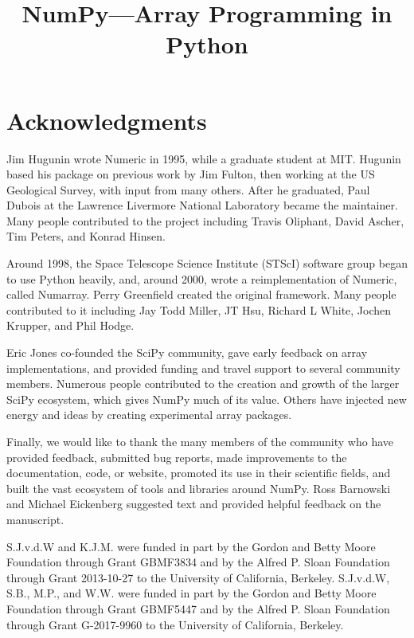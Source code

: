 \documentclass[fleqn,10pt,twocolumn]{wlscirep}
\title{NumPy---Array Programming in Python}
\begin{document}
\flushbottom
\maketitle
\thispagestyle{empty}







\newpage



\section*{Acknowledgments}

Jim Hugunin wrote Numeric in 1995, while a graduate student at MIT.
Hugunin based his package on previous work by Jim Fulton, then working at the
US Geological Survey, with input from many others.
After he graduated, Paul Dubois at the Lawrence Livermore National Laboratory
became the maintainer.
Many people contributed to the project including Travis Oliphant, David Ascher,
Tim Peters, and Konrad Hinsen.

Around 1998, the Space Telescope Science Institute (STScI) software group began
to use Python heavily, and, around 2000, wrote a reimplementation of
Numeric, called Numarray.
Perry Greenfield created the original framework.
Many people contributed to it including Jay Todd Miller, JT Hsu, Richard
L White, Jochen Krupper, and Phil Hodge.

Eric Jones co-founded the SciPy community, gave early feedback on array
implementations, and provided funding and travel support to several community
members.
Numerous people contributed to the creation and growth of the larger SciPy
ecosystem, which gives NumPy much of its value.  Others have injected new
energy and ideas by creating experimental array packages.

Finally, we would like to thank the many members of the community who have provided
feedback, submitted bug reports, made improvements to the documentation,
code, or website, promoted its use in their scientific fields, and built
the vast ecosystem of tools and libraries around NumPy.
Ross Barnowski and Michael Eickenberg suggested text and provided
helpful feedback on the manuscript.

S.J.v.d.W and K.J.M. were funded in part by the Gordon and Betty Moore
Foundation through Grant GBMF3834 and by the Alfred P. Sloan Foundation through
Grant 2013-10-27 to the University of California, Berkeley.
S.J.v.d.W, S.B., M.P., and W.W. were funded in part by the Gordon
and Betty Moore Foundation through Grant GBMF5447 and by the Alfred
P. Sloan Foundation through Grant G-2017-9960 to the University of
California, Berkeley.
\end{document}

